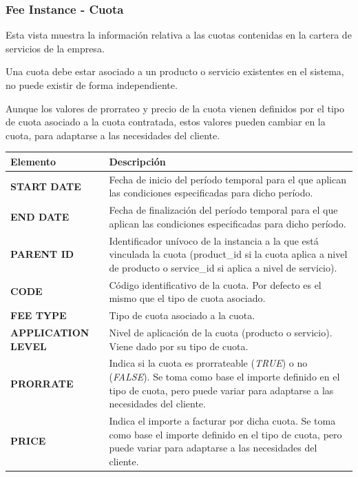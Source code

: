 \subsubsection{Fee Instance - Cuota}
\label{sub:fee}

Esta vista muestra la información relativa a las cuotas contenidas en la cartera de servicios de la empresa.

Una cuota debe estar asociado a un producto o servicio existentes en el sistema, no puede existir de forma independiente.

Aunque los valores de prorrateo y precio de la cuota vienen definidos por el tipo de cuota asociado a la cuota contratada, estos valores pueden cambiar en la cuota, para adaptarse a las necesidades del cliente.


\begin{table}
  \centering
  \setlength{\leftmargini}{0.4cm}
  \resizebox{14cm}{!} {
  \begin{tabular}{|m{4cm} m{11cm}|}
  \rowcolor{udcpink!25}
  \hline
  	\textbf{Elemento} & \textbf{Descripción} \\\hline
  	\textbf{START DATE} & Fecha de inicio del período temporal para el que aplican las condiciones especificadas para dicho período.\\
  	\textbf{END DATE} & Fecha de finalización del período temporal para el que aplican las condiciones especificadas para dicho período.\\
	\textbf{PARENT ID} & Identificador unívoco de la instancia a la que está vinculada la cuota (product\_id si la cuota aplica a nivel de producto o service\_id si aplica a nivel de servicio).\\
	\textbf{CODE} & Código identificativo de la cuota. Por defecto es el mismo que el tipo de cuota asociado.\\	
	\textbf{FEE TYPE} & Tipo de cuota asociado a la cuota.\\
	\textbf{APPLICATION LEVEL} & Nivel de aplicación de la cuota (producto o servicio). Viene dado por su tipo de cuota.\\
	\textbf{PRORRATE} & Indica si la cuota es prorrateable (\textit{TRUE}) o no (\textit{FALSE}). Se toma como base el importe definido en el tipo de cuota, pero puede variar para adaptarse a las necesidades del cliente.\\
	\textbf{PRICE} & Indica el importe a facturar por dicha cuota. Se toma como base el importe definido en el tipo de cuota, pero puede variar para adaptarse a las necesidades del cliente.\\

\end{tabular}}
\end{table}
